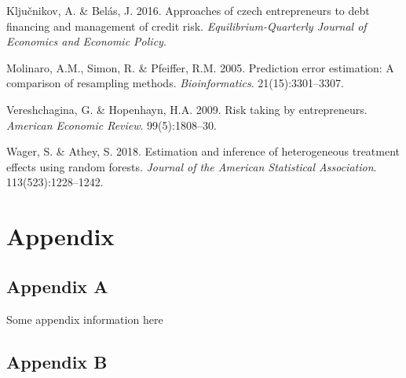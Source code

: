 \documentclass[11pt,preprint, authoryear]{elsarticle}
\numberwithin{equation}{section}
\numberwithin{figure}{section}
\numberwithin{table}{section}
\newlength{\cslhangindent}
\newenvironment{CSLReferences}%
  {\setlength{\parindent}{0pt}%
  \everypar{\setlength{\hangindent}{\cslhangindent}}\ignorespaces}%
  {\par}
\begin{document}
\begin{CSLReferences}{1}{0}
\leavevmode\hypertarget{ref-Entrep}{}%
Ključnikov, A. \& Belás, J. 2016. Approaches of czech entrepreneurs to
debt financing and management of credit risk.
\emph{Equilibrium-Quarterly Journal of Economics and Economic Policy}.

\leavevmode\hypertarget{ref-Molinaro}{}%
Molinaro, A.M., Simon, R. \& Pfeiffer, R.M. 2005. Prediction error
estimation: A comparison of resampling methods. \emph{Bioinformatics}.
21(15):3301--3307.

\leavevmode\hypertarget{ref-Risk}{}%
Vereshchagina, G. \& Hopenhayn, H.A. 2009. Risk taking by entrepreneurs.
\emph{American Economic Review}. 99(5):1808--30.

\leavevmode\hypertarget{ref-AtheyASA2018}{}%
Wager, S. \& Athey, S. 2018. Estimation and inference of heterogeneous
treatment effects using random forests. \emph{Journal of the American
Statistical Association}. 113(523):1228--1242.

\end{CSLReferences}

\hypertarget{appendix}{%
\section*{Appendix}\label{appendix}}

\hypertarget{appendix-a}{%
\subsection*{Appendix A}\label{appendix-a}}

Some appendix information here

\hypertarget{appendix-b}{%
\subsection*{Appendix B}\label{appendix-b}}


\end{document}
